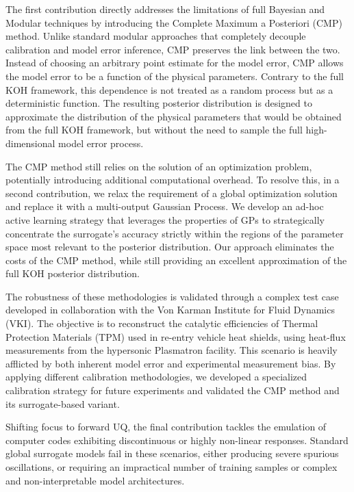 \smallskip
The first contribution directly addresses the limitations of full Bayesian and Modular techniques by introducing the Complete Maximum a Posteriori (CMP) method. Unlike standard modular approaches that completely decouple calibration and model error inference, CMP preserves the link between the two.
Instead of choosing an arbitrary point estimate for the model error, CMP allows the model error to be a function of the physical parameters. Contrary to the full KOH framework, this dependence is not treated as a random process but as a deterministic function.
The resulting posterior distribution is designed to approximate the distribution of the physical parameters that would be obtained from the full KOH framework, but without the need to sample the full high-dimensional model error process. 

\smallskip
The CMP method still relies on the solution of an optimization problem, potentially introducing additional computational overhead. To resolve this, 
in a second contribution, we relax the requirement of a global optimization solution and replace it with a multi-output Gaussian Process. We develop an ad-hoc active learning strategy that leverages the properties of GPs to strategically concentrate the surrogate's accuracy strictly within the regions of the parameter space most relevant to the posterior distribution. Our approach eliminates the costs of the CMP method, while still providing an excellent approximation of the full KOH posterior distribution.

\smallskip
The robustness of these methodologies is validated through a complex test case developed in collaboration with the Von Karman Institute for Fluid Dynamics (VKI). The objective is to reconstruct the catalytic efficiencies of Thermal Protection Materials (TPM) used in re-entry vehicle heat shields, using heat-flux measurements from the hypersonic Plasmatron facility. This scenario is heavily afflicted by both inherent model error and experimental measurement bias. By applying different calibration methodologies, we developed a specialized calibration strategy for future experiments and validated the CMP method and its surrogate-based variant. 

\smallskip
Shifting focus to forward UQ, the final contribution tackles the emulation of computer codes exhibiting discontinuous or highly non-linear responses. Standard global surrogate models fail in these scenarios, either producing severe spurious oscillations, or requiring an impractical number of training samples or complex and non-interpretable model architectures.

